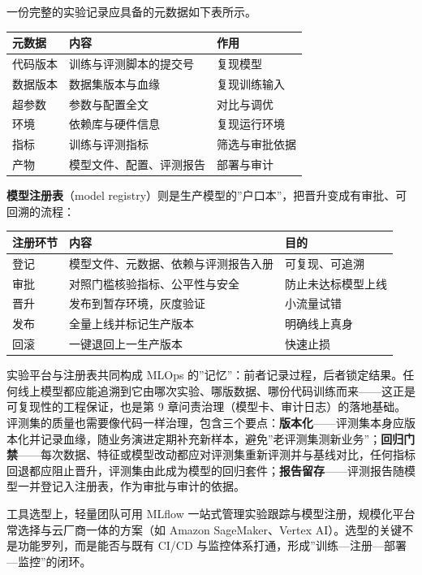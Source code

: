 \documentclass[12pt,a4paper,twoside,openany]{ctexbook}
\numberwithin{figure}{chapter}
\numberwithin{table}{chapter}
\newcounter{none}
\begin{document}
一份完整的实验记录应具备的元数据如下表所示。

{\def\LTcaptype{none} %
\begin{longtable}[]{@{}lll@{}}
\toprule\noalign{}
元数据 & 内容 & 作用 \\
\midrule\noalign{}
\endhead
\bottomrule\noalign{}
\endlastfoot
代码版本 & 训练与评测脚本的提交号 & 复现模型 \\
数据版本 & 数据集版本与血缘 & 复现训练输入 \\
超参数 & 参数与配置全文 & 对比与调优 \\
环境 & 依赖库与硬件信息 & 复现运行环境 \\
指标 & 训练与评测指标 & 筛选与审批依据 \\
产物 & 模型文件、配置、评测报告 & 部署与审计 \\
\end{longtable}
}

\textbf{模型注册表}（model
registry）则是生产模型的''户口本''，把晋升变成有审批、可回溯的流程：

{\def\LTcaptype{none} %
\begin{longtable}[]{@{}lll@{}}
\toprule\noalign{}
注册环节 & 内容 & 目的 \\
\midrule\noalign{}
\endhead
\bottomrule\noalign{}
\endlastfoot
登记 & 模型文件、元数据、依赖与评测报告入册 & 可复现、可追溯 \\
审批 & 对照门槛核验指标、公平性与安全 & 防止未达标模型上线 \\
晋升 & 发布到暂存环境，灰度验证 & 小流量试错 \\
发布 & 全量上线并标记生产版本 & 明确线上真身 \\
回滚 & 一键退回上一生产版本 & 快速止损 \\
\end{longtable}
}

实验平台与注册表共同构成 MLOps
的''记忆''：前者记录过程，后者锁定结果。任何线上模型都应能追溯到它由哪次实验、哪版数据、哪份代码训练而来------这正是可复现性的工程保证，也是第
9
章问责治理（模型卡、审计日志）的落地基础。评测集的质量也需要像代码一样治理，包含三个要点：\textbf{版本化}------评测集本身应版本化并记录血缘，随业务演进定期补充新样本，避免''老评测集测新业务''；\textbf{回归门禁}------每次数据、特征或模型改动都应对评测集重新评测并与基线对比，任何指标回退都应阻止晋升，评测集由此成为模型的回归套件；\textbf{报告留存}------评测报告随模型一并登记入注册表，作为审批与审计的依据。

工具选型上，轻量团队可用 MLflow
一站式管理实验跟踪与模型注册，规模化平台常选择与云厂商一体的方案（如
Amazon SageMaker、Vertex AI）。选型的关键不是功能罗列，而是能否与既有
CI/CD 与监控体系打通，形成''训练---注册---部署---监控''的闭环。
\end{document}
